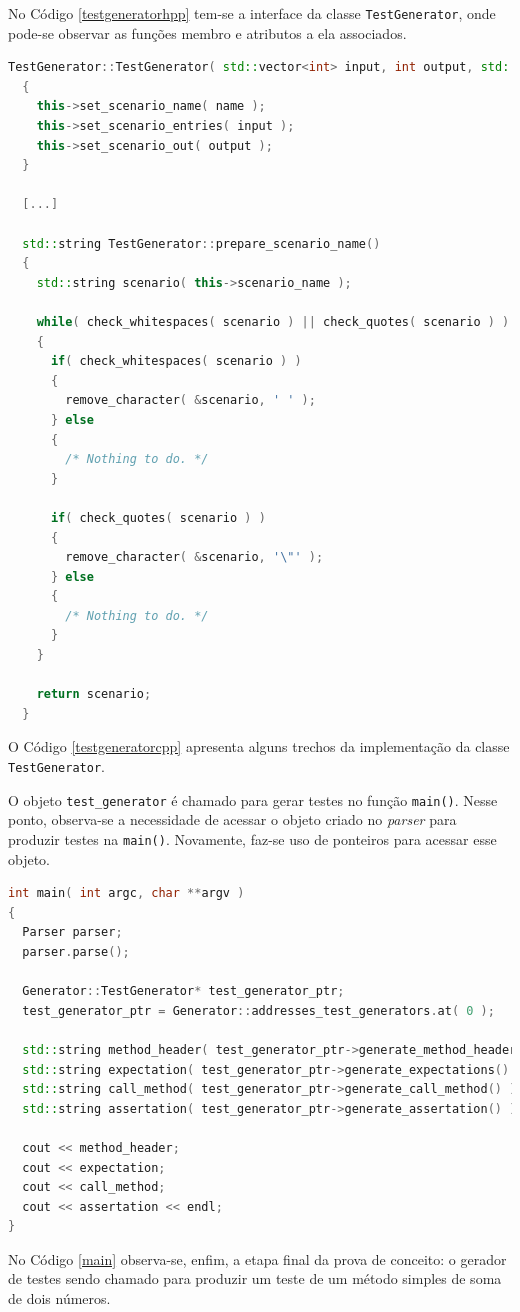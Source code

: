 \par
\indent No Código \ref{testgeneratorhpp} tem-se a interface da classe \lstinline|TestGenerator|, onde pode-se observar as funções membro e atributos a ela associados.
\par
\begin{lstlisting}[language=C++, label=testgeneratorcpp, caption=Trecho de implementação da classe TestGenerator]
  TestGenerator::TestGenerator( std::vector<int> input, int output, std::string name )
  {
    this->set_scenario_name( name );
    this->set_scenario_entries( input );
    this->set_scenario_out( output );
  }
  
  [...]
  
  std::string TestGenerator::prepare_scenario_name()
  {
    std::string scenario( this->scenario_name );

    while( check_whitespaces( scenario ) || check_quotes( scenario ) )
    {
      if( check_whitespaces( scenario ) )
      {
        remove_character( &scenario, ' ' );
      } else
      {
        /* Nothing to do. */
      }

      if( check_quotes( scenario ) )
      {
        remove_character( &scenario, '\"' );
      } else
      {
        /* Nothing to do. */
      }
    }

    return scenario;
  }
\end{lstlisting}
\par
\indent O Código \ref{testgeneratorcpp} apresenta alguns trechos da implementação da classe \lstinline|TestGenerator|.
\par
\indent O objeto \lstinline|test_generator| é chamado para gerar testes no função \lstinline|main()|. Nesse ponto, observa-se a necessidade de acessar o objeto criado no \textit{parser} para produzir testes na \lstinline|main()|. Novamente, faz-se uso de ponteiros para acessar esse objeto.
\begin{lstlisting}[language=C++, label=main, caption=função \lstinline|main()| Fazendo Uso da \lstinline|TestGenerator|]
int main( int argc, char **argv )
{
  Parser parser;
  parser.parse();

  Generator::TestGenerator* test_generator_ptr;
  test_generator_ptr = Generator::addresses_test_generators.at( 0 );

  std::string method_header( test_generator_ptr->generate_method_header() );
  std::string expectation( test_generator_ptr->generate_expectations() );
  std::string call_method( test_generator_ptr->generate_call_method() );
  std::string assertation( test_generator_ptr->generate_assertation() );

  cout << method_header;
  cout << expectation;
  cout << call_method;
  cout << assertation << endl;
}
\end{lstlisting}
\par
\indent No Código \ref{main} observa-se, enfim, a etapa final da prova de conceito: o gerador de testes sendo chamado para produzir um teste de um método simples de soma de dois números.

